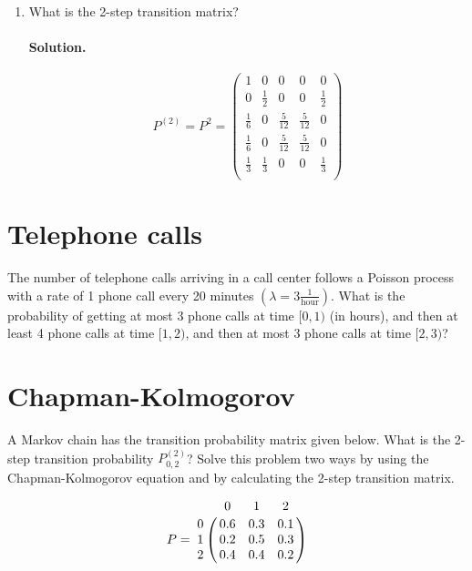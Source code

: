 \documentclass[a4paper, 12pt]{article}
\newcommand{\rbra}[1]{\left( #1 \right)}
\newcommand{\sol}[1]{\paragraph{Solution.} #1}
\newcommand{\task}[2]{
    \item #1 \sol{#2}
}
\begin{document}
\begin{enumerate}
{    }
    \task{What is the 2-step transition matrix?}
    {
        \[
            P^{(2)} = P^2 = \begin{pmatrix}
                1           & 0           & 0            & 0            & 0           \\
                0           & \frac{1}{2} & 0            & 0            & \frac{1}{2} \\
                \frac{1}{6} & 0           & \frac{5}{12} & \frac{5}{12} & 0           \\
                \frac{1}{6} & 0           & \frac{5}{12} & \frac{5}{12} & 0           \\
                \frac{1}{3} & \frac{1}{3} & 0            & 0            & \frac{1}{3} \\
            \end{pmatrix}
        \]
    }
\end{enumerate}

\section{Telephone calls}
The number of telephone calls arriving in a call center follows a Poisson process with a rate
of 1 phone call every 20 minutes $\rbra{\lambda = 3 \frac{1}{\text{hour}}}$.
What is the probability of getting at most
3 phone calls at time $[0, 1)$ (in hours), and then at least 4 phone calls at time $[1, 2)$, and
then at most 3 phone calls at time $[2, 3)$?

\section{Chapman-Kolmogorov}
A Markov chain has the transition probability matrix given below. What is the 2-step transition probability
$P^{(2)}_{0,2}$? Solve this problem two ways by using the Chapman-Kolmogorov
equation and by calculating the 2-step transition matrix.

\[
    P = \bordermatrix{
        & 0 & 1 & 2 \cr
        0 & 0.6 & 0.3 & 0.1  \cr
        1 & 0.2 & 0.5 & 0.3 \cr
        2 & 0.4 & 0.4 & 0.2
    }
\]
\end{document}
